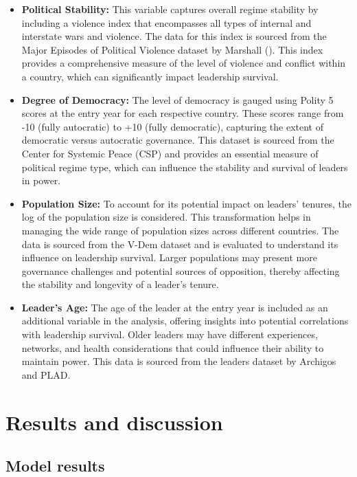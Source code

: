\documentclass[
  12pt,
]{report}
\begin{document}
\begin{itemize}
\item
  \textbf{Political Stability:} This variable captures overall regime
  stability by including a violence index that encompasses all types of
  internal and interstate wars and violence. The data for this index is
  sourced from the Major Episodes of Political Violence dataset by
  Marshall (). This index
  provides a comprehensive measure of the level of violence and conflict
  within a country, which can significantly impact leadership survival.
\item
  \textbf{Degree of Democracy:} The level of democracy is gauged using
  Polity 5 scores at the entry year for each respective country. These
  scores range from -10 (fully autocratic) to +10 (fully democratic),
  capturing the extent of democratic versus autocratic governance. This
  dataset is sourced from the Center for Systemic Peace (CSP) and
  provides an essential measure of political regime type, which can
  influence the stability and survival of leaders in power.
\item
  \textbf{Population Size:} To account for its potential impact on
  leaders' tenures, the log of the population size is considered. This
  transformation helps in managing the wide range of population sizes
  across different countries. The data is sourced from the V-Dem dataset
  and is evaluated to understand its influence on leadership survival.
  Larger populations may present more governance challenges and
  potential sources of opposition, thereby affecting the stability and
  longevity of a leader's tenure.
\item
  \textbf{Leader's Age:} The age of the leader at the entry year is
  included as an additional variable in the analysis, offering insights
  into potential correlations with leadership survival. Older leaders
  may have different experiences, networks, and health considerations
  that could influence their ability to maintain power. This data is
  sourced from the leaders dataset by Archigos and PLAD.
\end{itemize}

\section{Results and discussion}\label{results-and-discussion-1}

\subsection{Model results}\label{model-results}
\end{document}
